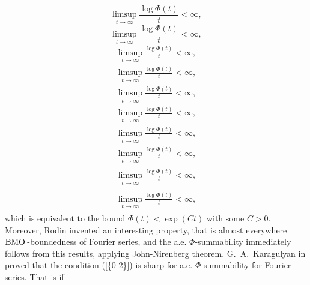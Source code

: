 \documentclass{amsart}
\numberwithin{equation}{section}
\begin{document}
{
\begin{equation*} \label{0-2}
\limsup_{t\to\infty}\frac{\log\Phi(t)}{t}<\infty,
 \end{equation*}\fi  
{}\begin{equation}\label{0-2}
\limsup_{t\to\infty}\frac{\log\Phi(t)}{t}<\infty,
\end{equation}\fi   
{}\begin{align*}\label{0-2}
\limsup_{t\to\infty}\frac{\log\Phi(t)}{t}<\infty,
\end{align*}\fi   
{}\begin{align}\label{0-2}
\limsup_{t\to\infty}\frac{\log\Phi(t)}{t}<\infty,
\end{align}\fi    
{}\begin{gather*}\label{0-2}
\limsup_{t\to\infty}\frac{\log\Phi(t)}{t}<\infty,
\end{gather*}\fi  
{}\begin{gather}\label{0-2}
\limsup_{t\to\infty}\frac{\log\Phi(t)}{t}<\infty,
\end{gather}\fi   
{}\begin{multline*}\label{0-2}
\limsup_{t\to\infty}\frac{\log\Phi(t)}{t}<\infty,
\end{multline*}\fi  
{}\begin{multline}\label{0-2}
\limsup_{t\to\infty}\frac{\log\Phi(t)}{t}<\infty,
\end{multline}\fi  
{}\begin{multline*}\begin{split}\label{0-2}
\limsup_{t\to\infty}\frac{\log\Phi(t)}{t}<\infty,
\end{split}\end{multline*}\fi
{}\begin{multline}\begin{split}\label{0-2}
\limsup_{t\to\infty}\frac{\log\Phi(t)}{t}<\infty,
\end{split}\end{multline}\fi
}
which is equivalent to the bound $\Phi(t)<\exp(Ct)$ with some $C>0$. Moreover, Rodin invented an interesting  property, that is almost everywhere ${{\rm BMO\,}}$-boundedness of Fourier series, and the  a.e. $\Phi$-summability immediately follows from this results, applying John-Nirenberg theorem. G.~A.~Karagulyan in \cite{Kar1,Kar2} proved that the condition {(\ref{{0-2}})} is sharp for a.e. $\Phi$-summability for Fourier series. That is if
\end{document}
